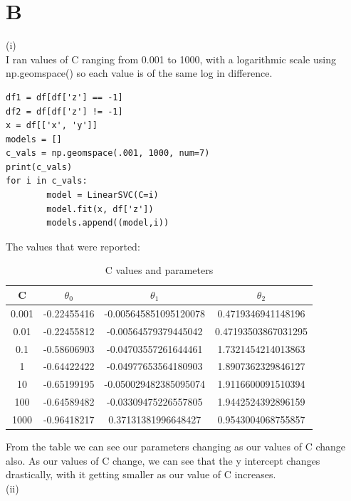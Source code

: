 \documentclass[10pt,a4paper]{article}
\begin{document}
\section{B}
(i)
\\ I ran values of C ranging from 0.001 to 1000, with a logarithmic scale using np.geomspace() so each value is of the same log in difference. 
\begin{verbatim}
df1 = df[df['z'] == -1]
df2 = df[df['z'] != -1]
x = df[['x', 'y']]
models = []
c_vals = np.geomspace(.001, 1000, num=7)
print(c_vals)
for i in c_vals:
        model = LinearSVC(C=i)
        model.fit(x, df['z'])
        models.append((model,i))
\end{verbatim}
The values that were reported:
\begin{table}[h]
\begin{center}
\begin{tabular}{| c | c | c | c |}
\hline
C & \(\theta_0\) & \(\theta_1\) & \(\theta_2\) \\
\hline
0.001 & -0.22455416  & -0.005645851095120078 & 0.4719346941148196 \\
\hline
0.01 & -0.22455812 & -0.00564579379445042 & 0.47193503867031295 \\
\hline
0.1 & -0.58606903 & -0.04703557261644461 & 1.7321454214013863 \\
\hline
1 & -0.64422422 & -0.04977653564180903 & 1.8907362329846127 \\
\hline
10 & -0.65199195 & -0.050029482385095074 & 1.9116600091510394 \\
\hline
100 & -0.64589482 & -0.03309475226557805 & 1.9442524392896159 \\
\hline
1000 & -0.96418217 & 0.37131381996648427 & 0.9543004068755857 \\
\hline
\end{tabular}
\caption{C values and parameters}
\end{center}
\end{table}
From the table we can see our parameters changing as our values of C change also. As our values of C change, we can see that the y intercept changes drastically, with it getting smaller as our value of C increases. 
\\
(ii)
\end{document}
